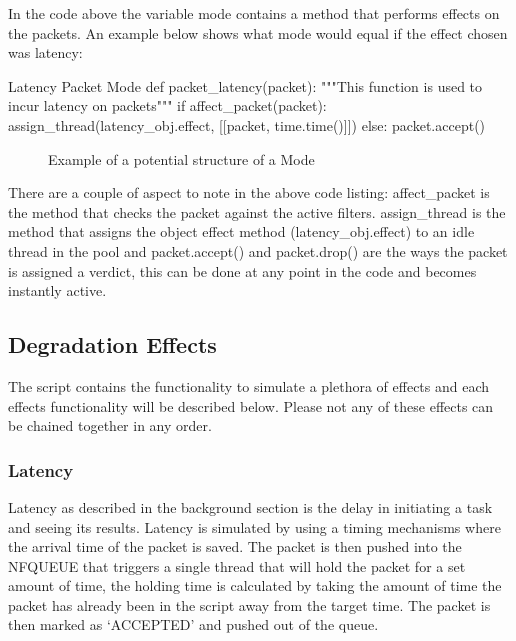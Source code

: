 In the code above the variable {\code mode} contains a method that performs effects on the packets. An example below shows what {\code mode} would equal if the effect chosen was latency:

\begin{Code}{Latency Packet Mode}
def packet_latency(packet):
    """This function is used to incur latency on packets"""
    if affect_packet(packet):
        assign_thread(latency_obj.effect, [[packet, time.time()]])
    else:
        packet.accept()
\end{Code}
\begin{figure}[h]
	\caption{Example of a potential structure of a {\code Mode}}
\end{figure}

There are a couple of aspect to note in the above code listing:
{\code affect\_packet} is the method that checks the packet against the active filters. {\code assign\_thread} is the method that assigns the object effect method ({\code latency\_obj.effect}) to an idle thread in the pool and 
{\code packet.accept()} and {\code packet.drop()} are the ways the packet is assigned a verdict, this can be done at any point in the code and becomes instantly active.


\subsection{Degradation Effects}
The script contains the functionality to simulate a plethora of effects and each effects functionality will be described below. Please not any of these effects can be chained together in any order.

\subsubsection{Latency}
Latency as described in the background section is the delay in initiating a task and seeing its results. Latency is simulated by using a timing mechanisms where the arrival time of the packet is saved. The packet is then pushed into the NFQUEUE that triggers a single thread that will hold the packet for a set amount of time, the holding time is calculated by taking the amount of time the packet has already been in the script away from the target time. The packet is then marked as `ACCEPTED' and pushed out of the queue.

